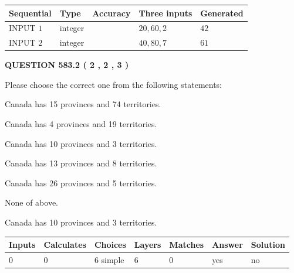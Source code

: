 \documentclass[12pt]{article}
\begin{document}
  
\noindent\begin{tabular}{|l|l|l|l|l|}
\hline
 Sequential & Type & Accuracy & Three inputs & Generated \\ 
\hline
 
 
  INPUT $  1 $ & integer &  & $
 20
 , 
 60
 , 
 2
 $ & $ 42 $ 
 \\  \hline  
 
 
  INPUT $  2 $ & integer &  & $
 40
 , 
 80
 , 
 7
 $ & $ 61 $ 
 \\  \hline  
 \end{tabular}
   
   
  
\vspace{0.2in}
  
{\textbf{\Large{QUESTION
583.2 
 ( 2 , 2 , 3 )
}}}
  
  
Please choose the correct one from the following statements:
 
 
Canada has  15 provinces and  74 territories.
 
 
Canada has   4 provinces and  19 territories.
 
 
Canada has 10  provinces and 3 territories.
 
 
Canada has  13 provinces and  8 territories.
 
 
Canada has  26 provinces and  5 territories.
 
 
 None of above.
 
 
\noindent{}
 
 
Canada has 10  provinces and 3 territories.
 
 
\noindent{}
 
 
   
   
   
   
\noindent\begin{tabular}{|l|l|l|l|l|l|l|}
 \hline
Inputs & Calculates & Choices & Layers & Matches & Answer & Solution \\ \hline
 0  & 
 0  & 
 6
  simple  
  & 
 6  & 
 0  & 
  yes & 
  no 
  \\ \hline
 \end{tabular}
   
\end{document}
